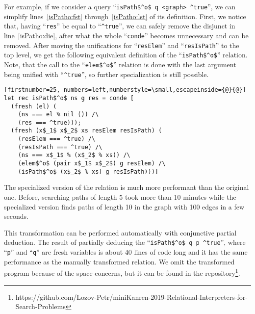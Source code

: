 For example, if we consider a query ``\lstinline{isPath$^o$ q <graph> ^true}'', we can simplify lines~\ref{isPatho:fst} through~\ref{isPatho:lst} of its definition. 
First, we notice that, having ``\lstinline{res}'' be equal to ``\lstinline{^true}'', we can safely remove the disjunct in line~\ref{isPatho:die}, after what the whole ``\lstinline{conde}'' becomes unnecessary and can be removed. 
After moving the unifications for ``\lstinline{resElem}'' and ``\lstinline{resIsPath}'' to the top level, we get the following equivalent definition of the ``\lstinline{isPath$^o$}'' relation. 
Note, that the call to the ``\lstinline{elem$^o$}'' relation is done with the last argument being unified with ``\lstinline{^true}'', so further specialization is still possible. 

\begin{lstlisting}[firstnumber=25, numbers=left,numberstyle=\small,escapeinside={@}{@}]
let rec isPath$^o$ ns g res = conde [
  (fresh (el) (
    (ns === el % nil ()) /\ 
    (res === ^true)));
  (fresh (x$_1$ x$_2$ xs resElem resIsPath) (
    (resElem === ^true) /\
    (resIsPath === ^true) /\
    (ns === x$_1$ % (x$_2$ % xs)) /\ 
    (elem$^o$ (pair x$_1$ x$_2$) g resElem) /\
    (isPath$^o$ (x$_2$ % xs) g resIsPath)))]
\end{lstlisting}

The specialized version of the relation is much more performant than the original one.
Before, searching paths of length 5 took more than 10 minutes while the specialized version finds paths of length 10 in the graph with 100 edges in a few seconds. 

This transformation can be performed automatically with conjunctive partial deduction. 
The result of partially deducing the ``\lstinline{isPath$^o$ q p ^true}'', where ``\lstinline{p}'' and ``\lstinline{q}'' are fresh variables is about 40 lines of code long and it has the same performance as the manually transformed relation. 
We omit the transformed program because of the space concerns, but it can be found in the repository\footnote{https://github.com/Lozov-Petr/miniKanren-2019-Relational-Interpreters-for-Search-Problems}.
